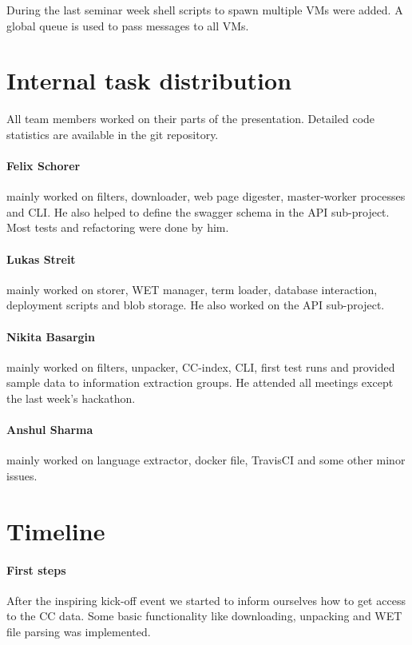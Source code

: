 \documentclass[DIV=calc, paper=a4, fontsize=11pt, twocolumn]{scrartcl}
\begin{document}
During the last seminar week shell scripts to spawn multiple VMs were added. A global queue is used to pass messages to all VMs.


\section*{Internal task distribution}
All team members worked on their parts of the presentation. 
Detailed code statistics are available in the git repository. 

\paragraph{Felix Schorer} mainly worked on filters, downloader, web page digester, master-worker processes and CLI. 
He also helped to define the swagger schema in the API sub-project. 
Most tests and refactoring were done by him.

\paragraph{Lukas Streit} mainly worked on storer, WET manager, term loader, database interaction, deployment scripts and blob storage. 
He also worked on the API sub-project.

\paragraph{Nikita Basargin} mainly worked on filters, unpacker, CC-index, CLI, first test runs and provided sample data to information extraction groups. 
He attended all meetings except the last week's hackathon.

\paragraph{Anshul Sharma} mainly worked on language extractor, docker file, TravisCI and some other minor issues.



\section*{Timeline}
\paragraph{First steps}
After the inspiring kick-off event we started to inform ourselves how to get access to the CC data. 
Some basic functionality like downloading, unpacking and WET file parsing was implemented.
\end{document}
